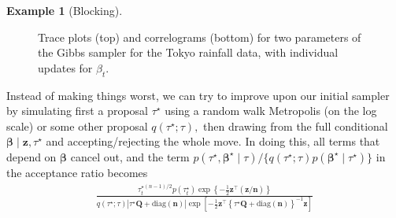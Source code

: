 \documentclass[
  11pt,
  letterpaper,
]{scrbook}
\theoremstyle{definition}
\newtheorem{example}{Example}[chapter]
\theoremstyle{plain}
\theoremstyle{plain}
\theoremstyle{plain}
\theoremstyle{definition}
\theoremstyle{definition}
\theoremstyle{plain}
\theoremstyle{plain}
\theoremstyle{remark}
\begin{document}
\begin{example}[Blocking]
\begin{figure}[ht!]
{}

\caption{\label{fig-tokyo-post2}Trace plots (top) and correlograms
(bottom) for two parameters of the Gibbs sampler for the Tokyo rainfall
data, with individual updates for \(\beta_t\).}

\end{figure}%

Instead of making things worst, we can try to improve upon our initial
sampler by simulating first a proposal \(\tau^{\star}\) using a random
walk Metropolis (on the log scale) or some other proposal
\(q(\tau^{\star}; \tau),\) then drawing from the full conditional
\(\boldsymbol{\beta} \mid \boldsymbol{z}, \tau^{\star}\) and
accepting/rejecting the whole move. In doing this, all terms that depend
on \(\boldsymbol{\beta}\) cancel out, and the term
\(p(\tau^{\star}, \boldsymbol{\beta}^{\star} \mid \tau)/\{q(\tau^{\star}; \tau)p(\boldsymbol{\beta}^{\star} \mid \tau^{\star})\}\)
in the acceptance ratio becomes \begin{align*}
\frac{\tau_t^{\star(n-1)/2} p(\tau_t^{\star})\exp \left\{-\frac{1}{2}\boldsymbol{z}^\top(\boldsymbol{z}/\boldsymbol{n})\right\}}{q(\tau^{\star}; \tau) \left| \tau^{\star}\mathbf{Q} + \mathrm{diag}(\boldsymbol{n})\right|\exp \left[-\frac{1}{2}\boldsymbol{z}^\top \left\{\tau^{\star}\mathbf{Q} + \mathrm{diag}(\boldsymbol{n})\right\}^{-1}\boldsymbol{z}\right]}
\end{align*}


\end{example}
\end{document}
